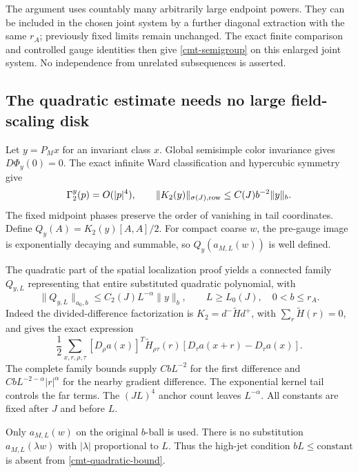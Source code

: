 \documentclass[11pt]{article}
\theoremstyle{remark}
\begin{document}
The argument uses countably many arbitrarily large endpoint
powers. They can be included in the chosen joint system by
a further diagonal extraction with the same \(r_A\);
previously fixed limits remain unchanged. The exact finite
comparison and controlled gauge identities then give
\eqref{cmt-semigroup} on this enlarged joint system.
No independence from unrelated subsequences is asserted.

\subsection{The quadratic estimate needs no large field-scaling disk}
\label{cmt-quadratic-section}

Let \(y=P_Mx\) for an invariant class \(x\). Global semisimple
color invariance gives \(D\Phi_y(0)=0\). The exact infinite Ward
classification and hypercubic symmetry give
\begin{equation}
 \Gamma_2^y(p)=O(|p|^4),\qquad
 \|K_2(y)\|_{\sigma(J),{\rm row}}
                         \le C(J)b^{-2}\|y\|_b.
 \label{cmt-kernel}
\end{equation}
The fixed midpoint phases preserve the order of vanishing in
tail coordinates. Define \(Q_y(A)=K_2(y)[A,A]/2\).
For compact coarse \(w\), the pre-gauge image is exponentially
decaying and summable, so \(Q_y(a_{M,L}(w))\) is well defined.

The quadratic part of the spatial localization proof yields
a connected family \(Q_{y,L}\) representing that entire
substituted quadratic polynomial, with
\begin{equation}
 \|Q_{y,L}\|_{a_0,b}
       \le C_2(J)L^{-\alpha}\|y\|_b,
       \qquad L\ge L_0(J),\quad 0<b\le r_A.
 \label{cmt-quadratic-bound}
\end{equation}
Indeed the divided-difference factorization is
\(K_2=d^-\widetilde H d^+\), with
\(\sum_r\widetilde H(r)=0\), and gives the exact expression
\[
 \frac12\sum_{x,r,\rho,\tau}
 [D_\rho a(x)]^T\widetilde H_{\rho\tau}(r)
                    [D_\tau a(x+r)-D_\tau a(x)].
\]
The complete family bounds supply \(CbL^{-2}\) for the first
difference and \(CbL^{-2-\alpha}|r|^\alpha\) for the nearby
gradient difference. The exponential kernel tail controls
the far terms. The \((JL)^4\) anchor count leaves
\(L^{-\alpha}\). All constants are fixed after \(J\) and
before \(L\).

Only \(a_{M,L}(w)\) on the original \(b\)-ball is used.
There is no substitution \(a_{M,L}(\lambda w)\) with
\(|\lambda|\) proportional to \(L\). Thus the high-jet
condition \(bL\le\text{constant}\) is absent from
\eqref{cmt-quadratic-bound}.
\end{document}
